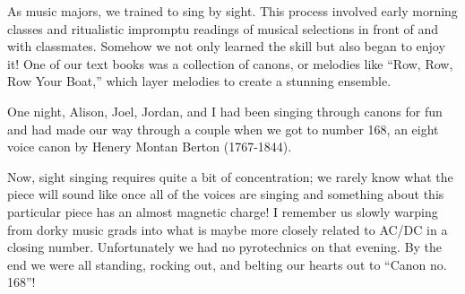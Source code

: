 As music majors, we trained to sing by sight. This process involved early
morning classes and ritualistic impromptu readings of musical selections in
front of and with classmates. Somehow we not only learned the skill but
also began to enjoy it! One of our text books was a collection of canons,
or melodies like ``Row, Row, Row Your Boat,'' which layer melodies to
create a stunning ensemble.

One night, Alison, Joel, Jordan, and I had been
singing through canons for fun and had made our way through a couple when
we got to number 168, an eight voice canon by Henery Montan Berton
(1767-1844).

Now, sight singing requires quite a bit of concentration; we
rarely know what the piece will sound like once all of the voices are
singing and something about this particular piece has an almost magnetic
charge!  I remember us slowly warping from dorky music grads into what is
maybe more closely related to AC/DC in a closing number. Unfortunately we
had no pyrotechnics on that evening. By the end we were all standing,
rocking out, and belting our hearts out to ``Canon no. 168''!

\bigskip
